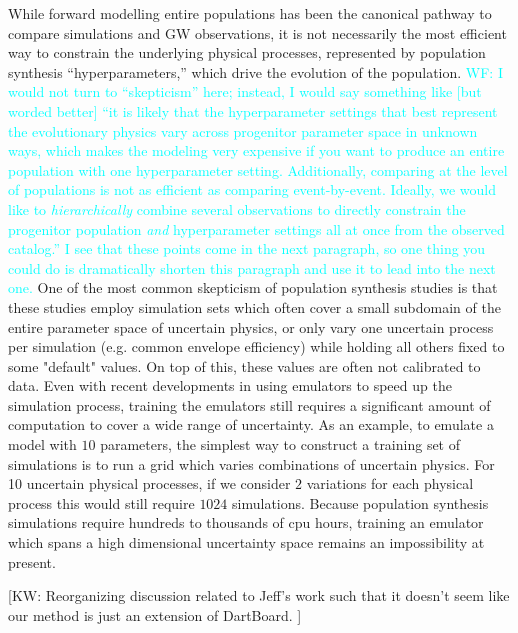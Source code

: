 \documentclass[twocolumn]{aastex631}
\newcommand{\kw}[1]{{\color{rb4}[KW: #1 ]}}
\newcommand{\wf}[1]{\textcolor{cyan}{WF: #1}}
\begin{document}
While forward modelling entire populations has been the canonical pathway to
compare simulations and GW observations, it is not necessarily the most
efficient way to constrain the underlying physical processes, represented by
population synthesis ``hyperparameters,'' which drive the evolution of the
population.  \wf{I would not turn to ``skepticism'' here; instead, I would say
something like [but worded better] ``it is likely that the hyperparameter
settings that best represent the evolutionary physics vary across progenitor
parameter space in unknown ways, which makes the modeling very expensive if you
want to produce an entire population with one hyperparameter setting.
Additionally, comparing at the level of populations is not as efficient as
comparing event-by-event.  Ideally, we would like to \emph{hierarchically}
combine several observations to directly constrain the progenitor population
\emph{and} hyperparameter settings all at once from the observed catalog.''  I
see that these points come in the next paragraph, so one thing you could do is
dramatically shorten this paragraph and use it to lead into the next one.} One
of the most common skepticism of population synthesis studies is that these
studies employ simulation sets which often cover a small subdomain of the entire
parameter space of uncertain physics, or only vary one uncertain process per
simulation (e.g. common envelope efficiency) while holding all others fixed to
some "default" values. On top of this, these values are often not calibrated to
data. Even with recent developments in using emulators to speed up the
simulation process, training the emulators still requires a significant amount
of computation to cover a wide range of uncertainty. As an example, to emulate a
model with $10$ parameters, the simplest way to construct a training set of
simulations is to run a grid which varies combinations of uncertain physics. For
10 uncertain physical processes, if we consider $2$ variations for each physical
process this would still require $1024$ simulations. Because population
synthesis simulations require hundreds to thousands of cpu hours, training an
emulator which spans a high dimensional uncertainty space remains an
impossibility at present.

\kw{Reorganizing discussion related to Jeff's work such that it doesn't seem like our method is just an extension of DartBoard.}
\end{document}
